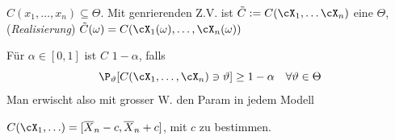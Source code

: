 \shortdefinition[Konfidenzbereich] $C(x_1, \ldots, x_n) \subseteq \Theta$.
Mit genrierenden Z.V. ist $\tilde{C} := C(\cX_1, \ldots \cX_n)$ eine  $\Theta$,
{\scriptsize (\textit{Realisierung}) $\tilde{C}(\omega) = C(\cX_1(\omega), \ldots, \cX_n(\omega))$}

Für $\alpha \in [0, 1]$ ist $C$  $1 - \alpha$, falls
\[
	\P_\vartheta[C(\cX_1, \ldots, \cX_n) \ni \vartheta] \geq 1 - \alpha \quad \forall \vartheta \in \Theta
\]
{\scriptsize Man erwischt also mit grosser W. den Param in jedem Modell}

\shortexample $C(\cX_1, \ldots) = [\overline{X}_n - c, \overline{X}_n + c]$, mit $c$ zu bestimmen.

